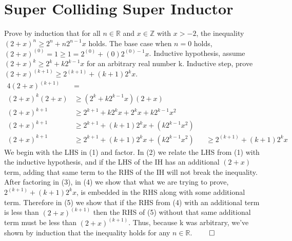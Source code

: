\documentclass[11pt]{article}
\newcommand{\R}{\mathbb{R}}
\newcommand{\Z}{\mathbb{Z}}
\begin{document}
\section{Super Colliding Super Inductor} %
Prove by induction that for all $n \in \R$ and $x \in \Z$ with $x > -2$, the inequality $(2 + x)^n \geq 2^n + n2^{n-1}x$ holds. The base case when $n = 0$ holds, $(2 + x)^{(0)} = 1 \geq 1 = 2^{(0)} + (0)2^{(0)-1}x$. Inductive hypothesis, assume $(2 + x)^k \geq 2^k + k2^{k-1}x$ for an arbitrary real number k. Inductive step, prove $(2 + x)^{(k+1)} \geq 2^{(k+1)} + {(k+1)}2^{k}x$.
\begin{alignat}{4}
	(2 + x)^{(k+1)} &= \\
	(2 + x)^k(2+x) &\geq (2^k + k2^{k-1}x)(2+x) \\
	(2 + x)^{k+1} &\geq 2^{k+1} + k2^{k}x + 2^{k}x + k2^{k-1}x^2 \\
	(2 + x)^{k+1} &\geq 2^{k+1} + (k+1)2^{k}x + (k2^{k-1}x^2) \\
	(2 + x)^{k+1} &\geq 2^{k+1} + (k+1)2^{k}x + (k2^{k-1}x^2) &&\geq 2^{(k+1)} + {(k+1)}2^{k}x
\end{alignat}
We begin with the LHS in (1) and factor. In (2) we relate the LHS from (1) with the inductive hypothesis, and if the LHS of the IH has an additional $(2+x)$ term, adding that same term to the RHS of the IH will not break the inequality. After factoring in (3), in (4) we show that what we are trying to prove, $2^{(k+1)} + {(k+1)}2^{k}x$, is embedded in the RHS along with some additional term. Therefore in (5) we show that if the RHS from (4) with an additional term is less than $(2 + x)^{(k+1)}$ then the RHS of (5) without that same additional term must be less than $(2 + x)^{(k+1)}$. Thus, because k was arbitrary, we've shown by induction that the inequality holds for any $n \in \R$. $\qed$
\end{document}
